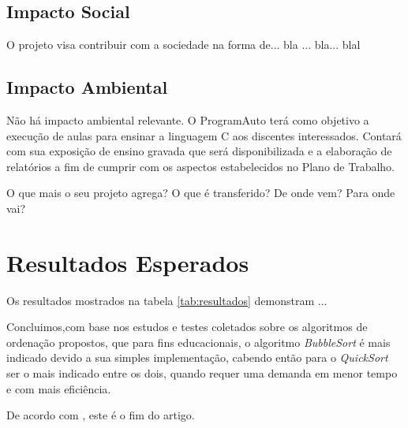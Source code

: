 \documentclass[a4paper,10pt]{article}  %
\begin{document}
\subsection{Impacto Social}

O projeto visa contribuir com a sociedade na forma de... bla ... bla... blal

\subsection{Impacto Ambiental}

Não há impacto ambiental relevante.
O ProgramAuto terá como objetivo a execução de aulas para ensinar a linguagem C aos discentes interessados. Contará com sua exposição de ensino gravada que será disponibilizada e a elaboração de relatórios a fim de cumprir com os aspectos estabelecidos no Plano de Trabalho.

O que mais o seu projeto agrega? O que é transferido? De onde vem? Para onde vai?


\section{Resultados Esperados}

Os resultados mostrados na tabela \ref{tab:resultados} demonstram ...

    Concluimos,com base nos estudos e testes coletados sobre os algoritmos de ordenação propostos, que para fins educacionais, o algoritmo \textit{BubbleSort} é mais indicado devido a sua simples implementação, cabendo então para o \textit{QuickSort} ser o mais indicado entre os dois, quando requer uma demanda em menor tempo e com mais eficiência.

De acordo com \cite{Benante2008phd}, este é o fim do artigo.


\nocite{*}
\end{document}
